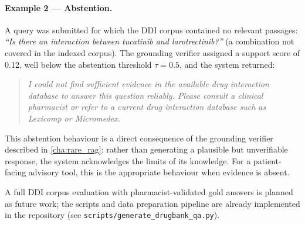 \paragraph{Example 2 --- Abstention.}
A query was submitted for which the DDI corpus contained no relevant passages:
\textit{``Is there an interaction between tucatinib and larotrectinib?''}
(a combination not covered in the indexed corpus).
The grounding verifier assigned a support score of 0.12, well below the
abstention threshold $\tau = 0.5$, and the system returned:

\begin{quote}\small
\textit{I could not find sufficient evidence in the available drug interaction
database to answer this question reliably.
Please consult a clinical pharmacist or refer to a current drug interaction
database such as Lexicomp or Micromedex.}
\end{quote}

This abstention behaviour is a direct consequence of the grounding verifier
described in \cref{cha:rare_rag}: rather than generating a plausible but
unverifiable response, the system acknowledges the limits of its knowledge.
For a patient-facing advisory tool, this is the appropriate behaviour when
evidence is absent.

A full DDI corpus evaluation with pharmacist-validated gold answers is planned
as future work; the scripts and data preparation pipeline are already implemented
in the repository (see \texttt{scripts/generate\_drugbank\_qa.py}).
